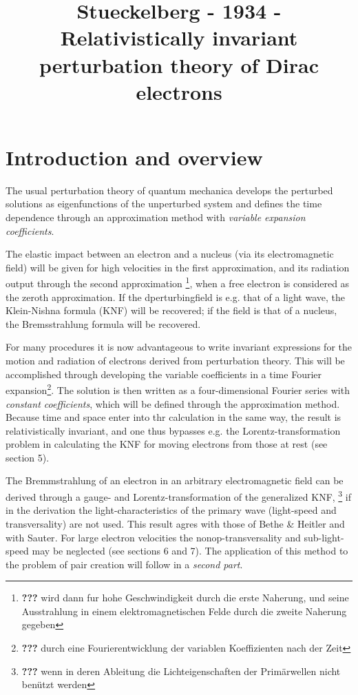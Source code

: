 \documentclass{article}
\title{Stueckelberg - 1934 - Relativistically invariant perturbation theory of Dirac electrons}
\newcommand{\WTF}[1]{\footnote{\textbf{???} #1}}
\renewcommand{\it}[1]{\textit{#1}}
\begin{document}
\section{Introduction and overview}

The usual perturbation theory of quantum mechanica develops the perturbed solutions as eigenfunctions of the unperturbed system and defines the time dependence through an approximation method with \it{variable expansion coefficients}.

The elastic impact between an electron and a nucleus (via its electromagnetic field) will be given for high velocities in the first approximation, and its radiation output through the second approximation \WTF{wird dann fur hohe Geschwindigkeit durch die erste Naherung, und seine Ausstrahlung in einem elektromagnetischen Felde durch die zweite Naherung gegeben}, when a free electron is considered as the zeroth approximation. If the dperturbingfield is e.g. that of a light wave, the Klein-Nishna formula (KNF) will be recovered; if the field is that of a nucleus, the Bremsstrahlung formula will be recovered.


For many procedures it is now advantageous to write invariant expressions for the motion and radiation of electrons derived from perturbation theory. This will be accomplished through developing the variable coefficients in a time Fourier expansion\WTF{durch eine Fourierentwicklung der variablen Koeffizienten nach der Zeit}. The solution is then written as a four-dimensional Fourier series with \it{constant coefficients}, which will be defined through the approximation method. Because time and space enter into thr calculation in the same way, the result is relativistically invariant, and one thus bypasses e.g. the Lorentz-transformation problem in calculating the KNF for moving electrons from those at rest (see section 5\cite{1}).

The Bremmstrahlung of an electron in an arbitrary electromagnetic field can be derived through a gauge- and Lorentz-transformation of the generalized KNF, \WTF{wenn in deren Ableitung die Lichteigenschaften der Primärwellen nicht benützt werden} if in the derivation the light-characteristics of the primary wave (light-speed and transversality) are not used. This result agres with those of Bethe \& Heitler and with Sauter\cite{2}. For large electron velocities the nonop-transversality and sub-light-speed may be neglected (see sections 6 and 7). The application of this method to the problem of pair creation will follow in a \it{second part}.
\end{document}
